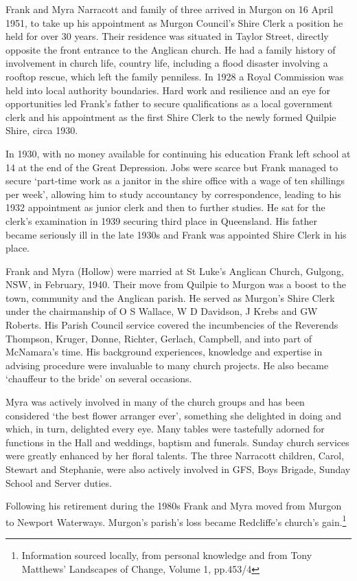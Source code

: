 Frank and Myra Narracott and family of three arrived in Murgon on 16 April 1951, to take up his appointment as Murgon Council's Shire Clerk a position he held for over 30 years. Their residence was situated in Taylor Street, directly opposite the front entrance to the Anglican church. He had a family history of involvement in church life, country life, including a flood disaster involving a rooftop rescue, which left the family penniless. In 1928 a Royal Commission was held into local authority boundaries. Hard work and resilience and an eye for opportunities led Frank's father to secure qualifications as a local government clerk and his appointment as the first Shire Clerk to the newly formed Quilpie Shire, circa 1930.

In 1930, with no money available for continuing his education Frank left school at 14 at the end of the Great Depression. Jobs were scarce but Frank managed to secure `part-time work as a janitor in the shire office with a wage of ten shillings per week', allowing him to study accountancy by correspondence, leading to his 1932 appointment as junior clerk and then to further studies. He sat for the clerk's examination in 1939 securing third place in Queensland. His father became seriously ill in the late 1930s and Frank was appointed Shire Clerk in his place.

Frank and Myra (Hollow) were married at St Luke's Anglican Church, Gulgong, NSW, in February, 1940. Their move from Quilpie to Murgon was a boost to the town, community and the Anglican parish. He served as Murgon's Shire Clerk under the chairmanship of O S Wallace, W D Davidson, J Krebs and GW Roberts. His Parish Council service covered the incumbencies of the Reverends Thompson, Kruger, Donne, Richter, Gerlach, Campbell, and into part of McNamara's time. His background experiences, knowledge and expertise in advising procedure were invaluable to many church projects. He also became `chauffeur to the bride' on several occasions.

Myra was actively involved in many of the church groups and has been considered `the best flower arranger ever', something she delighted in doing and which, in turn, delighted every eye. Many tables were tastefully adorned for functions in the Hall and weddings, baptism and funerals. Sunday church services were greatly enhanced by her floral talents. The three Narracott children, Carol, Stewart and Stephanie, were also actively involved in GFS, Boys Brigade, Sunday School and Server duties.

Following his retirement during the 1980s Frank and Myra moved from Murgon to Newport Waterways. Murgon's parish's loss became Redcliffe's church's gain.\footnote{Information sourced locally, from personal knowledge and from Tony Matthews' Landscapes of Change, Volume 1, pp.453/4}

